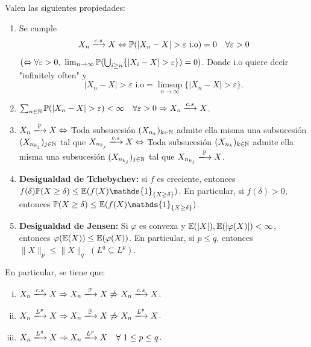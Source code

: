 \begin{prop}
	Valen las siguientes propiedades:
	\begin{enumerate}
		\item Se cumple
		\[ X_{n} \xlongrightarrow{c.s} X \iff \mbb{P}(|X_{n} - X| > \varepsilon \text{ i.o}) = 0 \quad \forall \varepsilon > 0 \]
		$(\Leftrightarrow \forall \varepsilon > 0,\ \lim_{n \to \infty} \mathbb{P}(\bigcup_{i \geq n} \{|X_{i} - X| > \varepsilon \}) = 0 )$. Donde i.o quiere decir "infinitely often" y 
		\[ |X_{n} - X| > \varepsilon \text{ i.o} = \limsup_{n \to \infty} \{|X_{n} - X| > \varepsilon\}. \]

		\item $\sum_{n \in \N} \mbb{P}(|X_{n} - X| > \varepsilon) < \infty \quad \forall \varepsilon > 0 \implies X_{n} \xlongrightarrow{c.s} X$.

		\item $X_{n} \xlongrightarrow{\mbb{P}} X \iff$ Toda subsucesión $(X_{n_{k}})_{k \in \mathbb{N}}$ admite ella misma una subsucesión $(X_{n_{k_{j}}})_{j \in \mathbb{N}}$ tal que $X_{n_{k_{j}}} \xlongrightarrow{c.s} X \iff$ Toda subsucesión $(X_{n_{k}})_{k \in \mathbb{N}}$ admite ella misma una subsucesión $(X_{n_{k_{j}}})_{j \in \mathbb{N}}$ tal que $X_{n_{k_{j}}} \xlongrightarrow{\mbb{P}} X$.

		\item \textbf{Desigualdad de Tchebychev:} si $f$ es creciente, entonces $f(\delta) \mbb{P}(X \geq \delta) \leq \mbb{E}(f(X) \mathds{1}_{\{X \geq \delta\}})$. En particular, si $f(\delta) > 0$, entonces $\mbb{P}(X \geq \delta) \leq \mbb{E}(f(X) \mathds{1}_{\{X \geq \delta\}})$.

		\item \textbf{Desigualdad de Jensen:} Si $\varphi$ es convexa y $\mathbb{E}(|X|), \mathbb{E}(|\varphi(X)|) < \infty$, entonces $\varphi(\mathbb{E}(X)) \leq \mathbb{E}(\varphi(X))$. En particular, si $p \leq q$, entonces $\| X \|_{p} \leq \| X \|_{q}$ $(L^{q} \subseteq L^{p})$.
	\end{enumerate}
	En particular, se tiene que:
	\begin{enumerate}[i)]
		\item $X_{n} \xlongrightarrow{c.s} X \implies X_{n} \xlongrightarrow{\mbb{P}} X \not\implies X_{n} \xlongrightarrow{c.s} X$.
		
		\item $X_{n} \xlongrightarrow{L^p} X \implies X_{n} \xlongrightarrow{\mbb{P}} X \not\implies X_{n} \xlongrightarrow{L^{p}} X$.

		\item $X_{n} \xlongrightarrow{L^{q}} X \implies X_{n} \xlongrightarrow{L^{p}} X \quad \forall \ 1 \leq p \leq q$.
	\end{enumerate}
\end{prop}

